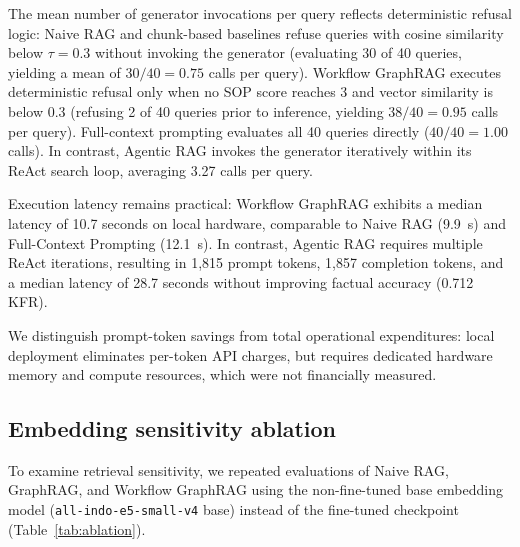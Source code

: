 \documentclass[preprint,10pt]{elsarticle}
\begin{document}
\begin{table}[!htbp]
\centering
\caption{Operational resource consumption per query across evaluated systems: mean prompt and completion tokens, mean generator invocations, and median execution latency across all 40 questions.}
\label{tab:cost}
\small
\setlength{\tabcolsep}{4pt}
\resizebox{\textwidth}{!}{%
}
\end{table}

The mean number of generator invocations per query reflects deterministic refusal logic: Naive RAG and chunk-based baselines refuse queries with cosine similarity below $\tau = 0.3$ without invoking the generator (evaluating 30 of 40 queries, yielding a mean of $30/40 = 0.75$ calls per query). Workflow GraphRAG executes deterministic refusal only when no SOP score reaches 3 and vector similarity is below 0.3 (refusing 2 of 40 queries prior to inference, yielding $38/40 = 0.95$ calls per query). Full-context prompting evaluates all 40 queries directly ($40/40 = 1.00$ calls). In contrast, Agentic RAG invokes the generator iteratively within its ReAct search loop, averaging 3.27 calls per query.

Execution latency remains practical: Workflow GraphRAG exhibits a median latency of 10.7 seconds on local hardware, comparable to Naive RAG (9.9~s) and Full-Context Prompting (12.1~s). In contrast, Agentic RAG requires multiple ReAct iterations, resulting in 1,815 prompt tokens, 1,857 completion tokens, and a median latency of 28.7 seconds without improving factual accuracy (0.712 KFR).

We distinguish prompt-token savings from total operational expenditures: local deployment eliminates per-token API charges, but requires dedicated hardware memory and compute resources, which were not financially measured.

\subsection{Embedding sensitivity ablation}
\label{sec:ablation-embedding}
To examine retrieval sensitivity, we repeated evaluations of Naive RAG, GraphRAG, and Workflow GraphRAG using the non-fine-tuned base embedding model (\texttt{all-indo-e5-small-v4} base) instead of the fine-tuned checkpoint (Table~\ref{tab:ablation}).

\begin{table}[!htbp]
\centering
\caption{Ablation evaluating fine-tuned (v3) versus non-fine-tuned base embedding representations: key-fact recall and step coverage across primary systems.}
\label{tab:ablation}
\small

\end{table}
\end{document}
